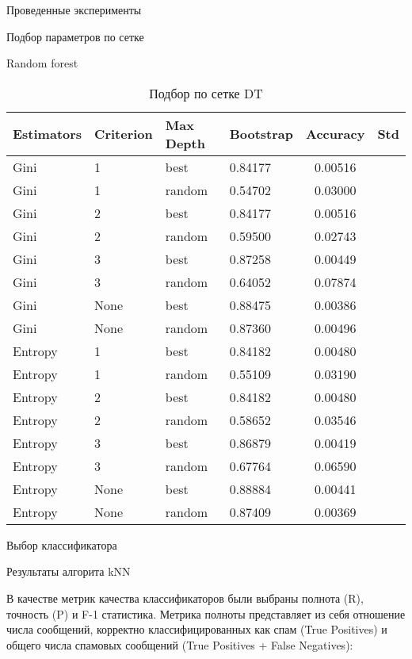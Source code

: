 \begin{section}{Проведенные эксперименты}
\begin{subsection}{Подбор параметров по сетке}
\begin{subsubsection}{Random forest}
  \begin{table}[H]
  \centering
  {\begin{tabular}{|l|l|l|l|c|c|}
  \hline
  \textbf{Estimators} & \textbf{Criterion} & \textbf{Max Depth} & \textbf{Bootstrap} & \textbf{Accuracy} & \textbf{Std} \\
  \hline
  Gini & 1  & best & 0.84177 & 0.00516 \\
  \hline
  Gini & 1  & random &  0.54702 & 0.03000 \\
  \hline
  Gini & 2  & best & 0.84177 & 0.00516 \\
  \hline
  Gini &  2 & random  & 0.59500 & 0.02743 \\
  \hline
  Gini & 3  & best & 0.87258 & 0.00449 \\
  \hline
  Gini & 3  & random & 0.64052 & 0.07874 \\
  \hline
  Gini & None  & best & 0.88475 & 0.00386 \\
  \hline
  Gini &  None & random  & 0.87360 & 0.00496 \\
  \hline
  Entropy & 1  & best & 0.84182 & 0.00480 \\
  \hline
  Entropy & 1  & random & 0.55109 & 0.03190 \\
  \hline
  Entropy  & 2  & best & 0.84182 & 0.00480 \\
  \hline
  Entropy  &  2 & random  & 0.58652 & 0.03546 \\
  \hline
  Entropy  & 3  & best &  0.86879 & 0.00419 \\
  \hline
  Entropy  & 3  & random & 0.67764 & 0.06590 \\
  \hline
  Entropy & None  & best & 0.88884 & 0.00441 \\
  \hline
  Entropy &  None & random  & 0.87409 & 0.00369 \\
  \hline
  \end{tabular}}

  \caption{Подбор по сетке DT}
  \label{grid:dt}
  \end{table}



\end{subsubsection}

\end{subsection}

\begin{subsection}{Выбор классификатора}

Результаты алгорита kNN


В качестве метрик качества классификаторов были выбраны полнота (R), точность (P) и F-1 статистика. Метрика полноты представляет из себя отношение числа сообщений, корректно классифицированных как спам (True Positives) и общего числа спамовых сообщений (True Positives + False Negatives):


\end{subsection}
\end{section}
